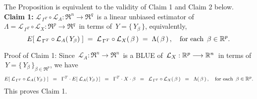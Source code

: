 \proof
The Proposition is equivalent to the validity of Claim 1 and Claim 2 below.
\vskip 0.3cm
\noindent
\textbf{Claim 1:}\quad
$\mathcal{L}_{\,\Gamma^{T}} \circ \mathcal{L}_{A} : \Re^{n} \longrightarrow \Re^{q}$\,
is a linear unbiased estimator of
\,$\Lambda = \mathcal{L}_{\,\Gamma^{T}}\circ\mathcal{L}_{X} : \Re^{p} \longrightarrow \Re^{q}$\,
in terms of
\,$Y = \{\,Y_{\beta}\,\}$, equivalently,
\begin{equation*}
E\!\left[\;\mathcal{L}_{\,\Gamma^{T}} \circ \mathcal{L}_{A}(\,Y_{\beta})\;\right]
\;=\;
	\mathcal{L}_{\,\Gamma^{T}}\circ\mathcal{L}_{X}(\,\beta\,)
\;=\;
	\Lambda(\,\beta\,)\,,
\quad
\textnormal{for each \,$\beta\in\Re^{p}$}.
\end{equation*}
Proof of Claim 1:\quad
Since \,$\mathcal{L}_{A} : \Re^{n} \longrightarrow \Re^{n}$\,
is a BLUE of
\,$\overset{{\color{white}+}}{\mathcal{L}}_{X} : \Re^{p} \longrightarrow \Re^{n}$\,
in terms of
\,$Y = \{\,Y_{\beta}\,\}_{\beta\in\Re^{p}}$,
we have
\begin{equation*}
E\!\left[\;\mathcal{L}_{\,\Gamma^{T}} \circ \mathcal{L}_{A}(\,Y_{\beta}\,)\;\right]
\;\; = \;\;
	\Gamma^{T} \cdot E\!\left[\;\mathcal{L}_{A}(\,Y_{\beta}\,)\,\right]
\;\; = \;\;
	\Gamma^{T} \cdot X \cdot \beta
\;\; = \;\;
	\mathcal{L}_{\,\Gamma^{T}} \circ \mathcal{L}_{X}(\,\beta\,)
\;\; = \;\;
	\Lambda(\,\beta\,)\,,
\quad
\textnormal{for each \,$\beta \in \Re^{p}$}.
\end{equation*}
This proves Claim 1.

